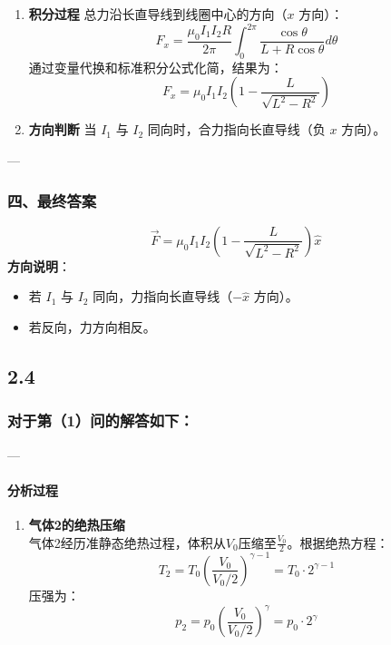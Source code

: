 \documentclass{article}
\begin{document}
{\begin{enumerate}
    \item \textbf{积分过程}  
    总力沿长直导线到线圈中心的方向（\( x \) 方向）：  
    \[
    F_x = \frac{\mu_0 I_1 I_2 R}{2\pi} \int_0^{2\pi} \frac{\cos\theta}{L + R\cos\theta} d\theta
    \]  
    通过变量代换和标准积分公式化简，结果为：  
    \[
    F_x = \mu_0 I_1 I_2 \left( 1 - \frac{L}{\sqrt{L^2 - R^2}} \right)
    \]

    \item \textbf{方向判断}  
    当 \( I_1 \) 与 \( I_2 \) 同向时，合力指向长直导线（负 \( x \) 方向）。
\end{enumerate}

---

\subsubsection*{四、最终答案}

\[
\boxed{
\vec{F} = \mu_0 I_1 I_2 \left( 1 - \frac{L}{\sqrt{L^2 - R^2}} \right) \hat{x}
}
\]  
\textbf{方向说明}：  
\begin{itemize}
    \item 若 \( I_1 \) 与 \( I_2 \) 同向，力指向长直导线（\( -\hat{x} \) 方向）。  
    \item 若反向，力方向相反。
\end{itemize}


\subsection*{2.4}

\subsubsection*{对于第（1）问的解答如下：}

---

\paragraph*{分析过程}

\begin{enumerate}
    \item \textbf{气体2的绝热压缩}  \\
    气体2经历准静态绝热过程，体积从\( V_0 \)压缩至\( \frac{V_0}{2} \)。根据绝热方程：  
    \[
    T_2 = T_0 \left( \frac{V_0}{V_0/2} \right)^{\gamma-1} = T_0 \cdot 2^{\gamma-1}
    \]  
    压强为：  
    \[
    p_2 = p_0 \left( \frac{V_0}{V_0/2} \right)^\gamma = p_0 \cdot 2^\gamma
    \]


\end{enumerate}}
\end{document}
